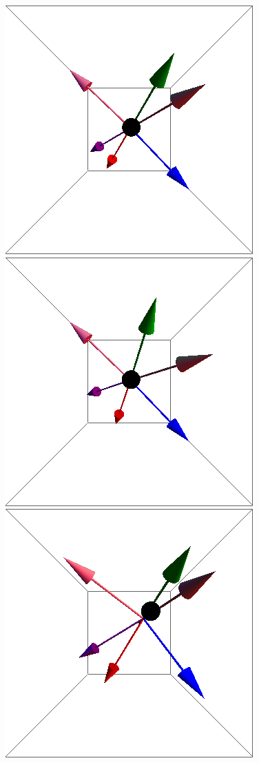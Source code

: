 \documentclass{article}
\begin{document}
\begin{figure}[ht]
\includegraphics[scale=0.27]{100/54S000to005R.png}
\includegraphics[scale=0.27]{100/55S000to005R.png}
\includegraphics[scale=0.27]{100/411S000to005R.png}

\end{figure}
\end{document}
